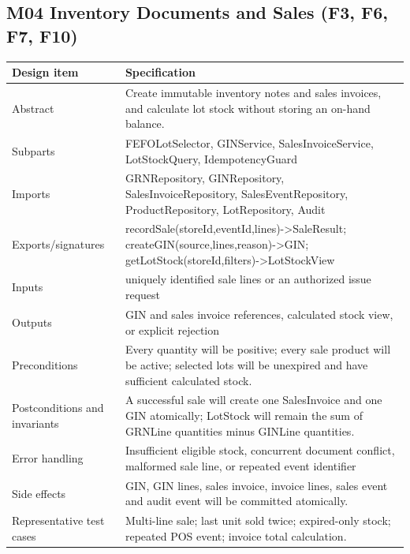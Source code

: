 \subsection{M04 Inventory Documents and Sales (F3, F6, F7, F10)}\label{m04-stock-ledger-and-sales-f3-f6-f7-f10}

{\def\LTcaptype{none} %
\begin{longtable}[]{|
  >{\raggedright\arraybackslash}m{}|
  >{\raggedright\arraybackslash}m{}|}
\hline
\begin{minipage}[c]{\linewidth}\raggedright
\textbf{Design item}
\end{minipage} & \begin{minipage}[c]{\linewidth}\raggedright
\textbf{Specification}
\end{minipage} \\
\hline
\endhead

\endlastfoot
Abstract & Create immutable inventory notes and sales invoices, and calculate lot stock without storing an on-hand balance. \\ \hline
Subparts & FEFOLotSelector, GINService, SalesInvoiceService, LotStockQuery, IdempotencyGuard \\ \hline
Imports & GRNRepository, GINRepository, SalesInvoiceRepository, SalesEventRepository, ProductRepository, LotRepository, Audit \\ \hline
Exports/signatures & recordSale(storeId,eventId,lines)-\textgreater SaleResult; createGIN(source,lines,reason)-\textgreater GIN; getLotStock(storeId,filters)-\textgreater LotStockView \\ \hline
Inputs & uniquely identified sale lines or an authorized issue request \\ \hline
Outputs & GIN and sales invoice references, calculated stock view, or explicit rejection \\ \hline
Preconditions & Every quantity will be positive; every sale product will be active; selected lots will be unexpired and have sufficient calculated stock. \\ \hline
Postconditions and invariants & A successful sale will create one SalesInvoice and one GIN atomically; LotStock will remain the sum of GRNLine quantities minus GINLine quantities. \\ \hline
Error handling & Insufficient eligible stock, concurrent document conflict, malformed sale line, or repeated event identifier \\ \hline
Side effects & GIN, GIN lines, sales invoice, invoice lines, sales event and audit event will be committed atomically. \\ \hline
Representative test cases & Multi-line sale; last unit sold twice; expired-only stock; repeated POS event; invoice total calculation. \\ \hline
\end{longtable}
}


